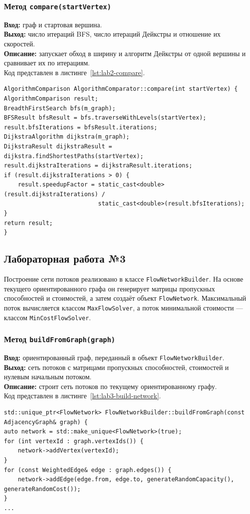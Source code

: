 \documentclass[14pt,a4paper]{extarticle}
\newcommand{\funcblock}[5]{%
\subsubsection*{Метод \code{#1}}
\noindent
\textbf{Вход:} #2\\
\textbf{Выход:} #3\\
\textbf{Описание:} #4\\
Код представлен в листинге~\ref{#5}.%
}
\newcommand{\code}[1]{\texttt{#1}}
\begin{document}
\funcblock
{compare(startVertex)}
{граф и стартовая вершина.}
{число итераций BFS, число итераций Дейкстры и отношение их скоростей.}
{запускает обход в ширину и алгоритм Дейкстры от одной вершины и сравнивает их по итерациям.}
{lst:lab2-compare}
\begin{lstlisting}[style=cppcode,caption={Фрагмент функции \code{compare(startVertex)}},label={lst:lab2-compare}]
AlgorithmComparison AlgorithmComparator::compare(int startVertex) {
AlgorithmComparison result;
BreadthFirstSearch bfs(m_graph);
BFSResult bfsResult = bfs.traverseWithLevels(startVertex);
result.bfsIterations = bfsResult.iterations;
DijkstraAlgorithm dijkstra(m_graph);
DijkstraResult dijkstraResult = dijkstra.findShortestPaths(startVertex);
result.dijkstraIterations = dijkstraResult.iterations;
if (result.dijkstraIterations > 0) {
    result.speedupFactor = static_cast<double>(result.dijkstraIterations) /
                           static_cast<double>(result.bfsIterations);
}
return result;
}
\end{lstlisting}

\subsection{Лабораторная работа №3}

Построение сети потоков реализовано в классе \code{FlowNetworkBuilder}. На основе текущего ориентированного графа он генерирует матрицы пропускных способностей и стоимостей, а затем создаёт объект \code{FlowNetwork}. Максимальный поток вычисляется классом \code{MaxFlowSolver}, а поток минимальной стоимости --- классом \code{MinCostFlowSolver}.

\funcblock
{buildFromGraph(graph)}
{ориентированный граф, переданный в объект \code{FlowNetworkBuilder}.}
{сеть потоков с матрицами пропускных способностей, стоимостей и нулевым начальным потоком.}
{строит сеть потоков по текущему ориентированному графу.}
{lst:lab3-build-network}
\begin{lstlisting}[style=cppcode,caption={Фрагмент функции \code{buildFromGraph(graph)}},label={lst:lab3-build-network}]
std::unique_ptr<FlowNetwork> FlowNetworkBuilder::buildFromGraph(const AdjacencyGraph& graph) {
auto network = std::make_unique<FlowNetwork>(true);
for (int vertexId : graph.vertexIds()) {
    network->addVertex(vertexId);
}
for (const WeightedEdge& edge : graph.edges()) {
    network->addEdge(edge.from, edge.to, generateRandomCapacity(), generateRandomCost());
}
...
\end{lstlisting}
\end{document}

